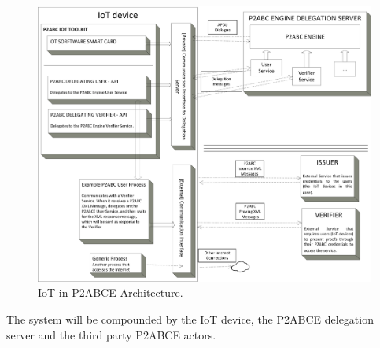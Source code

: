 \begin{figure}[bth]
	\begin{center}
		\includegraphics[width=\linewidth]{gfx/P2ABCE-IoT-bw}
	\end{center}
	\caption{IoT in P2ABCE Architecture.}
	\label{fig:P2ABCE-IoT}
\end{figure}


\hfil


The system will be compounded by the IoT device, the P2ABCE delegation server and the third party P2ABCE actors.

